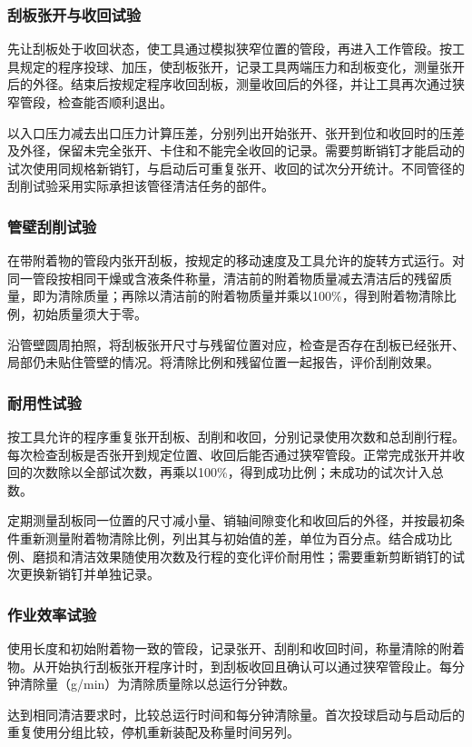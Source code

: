 \subsubsection{刮板张开与收回试验}
先让刮板处于收回状态，使工具通过模拟狭窄位置的管段，再进入工作管段。按工具规定的程序投球、加压，使刮板张开，记录工具两端压力和刮板变化，测量张开后的外径。结束后按规定程序收回刮板，测量收回后的外径，并让工具再次通过狭窄管段，检查能否顺利退出。

以入口压力减去出口压力计算压差，分别列出开始张开、张开到位和收回时的压差及外径，保留未完全张开、卡住和不能完全收回的记录。需要剪断销钉才能启动的试次使用同规格新销钉，与启动后可重复张开、收回的试次分开统计。不同管径的刮削试验采用实际承担该管径清洁任务的部件。

\subsubsection{管壁刮削试验}
在带附着物的管段内张开刮板，按规定的移动速度及工具允许的旋转方式运行。对同一管段按相同干燥或含液条件称量，清洁前的附着物质量减去清洁后的残留质量，即为清除质量；再除以清洁前的附着物质量并乘以100\%，得到附着物清除比例，初始质量须大于零。

沿管壁圆周拍照，将刮板张开尺寸与残留位置对应，检查是否存在刮板已经张开、局部仍未贴住管壁的情况。将清除比例和残留位置一起报告，评价刮削效果。

\subsubsection{耐用性试验}
按工具允许的程序重复张开刮板、刮削和收回，分别记录使用次数和总刮削行程。每次检查刮板是否张开到规定位置、收回后能否通过狭窄管段。正常完成张开并收回的次数除以全部试次数，再乘以100\%，得到成功比例；未成功的试次计入总数。

定期测量刮板同一位置的尺寸减小量、销轴间隙变化和收回后的外径，并按最初条件重新测量附着物清除比例，列出其与初始值的差，单位为百分点。结合成功比例、磨损和清洁效果随使用次数及行程的变化评价耐用性；需要重新剪断销钉的试次更换新销钉并单独记录。

\subsubsection{作业效率试验}
使用长度和初始附着物一致的管段，记录张开、刮削和收回时间，称量清除的附着物。从开始执行刮板张开程序计时，到刮板收回且确认可以通过狭窄管段止。每分钟清除量（g/min）为清除质量除以总运行分钟数。

达到相同清洁要求时，比较总运行时间和每分钟清除量。首次投球启动与启动后的重复使用分组比较，停机重新装配及称量时间另列。


